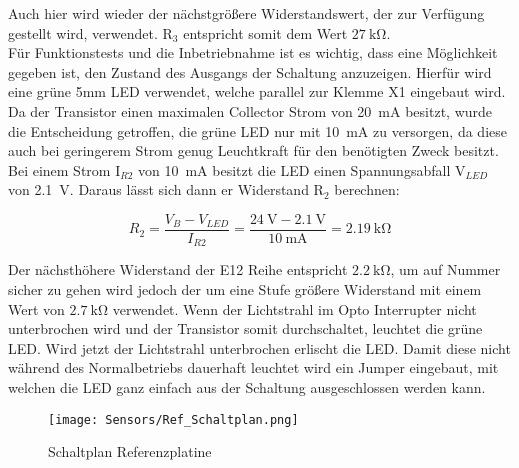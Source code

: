 Auch hier wird wieder der nächstgrößere Widerstandswert, der zur Verfügung gestellt wird, verwendet. R$_{3}$ entspricht somit dem Wert $\qty{27}{\kilo\ohm}$.\\
Für Funktionstests und die Inbetriebnahme ist es wichtig, dass eine Möglichkeit gegeben ist, den Zustand des Ausgangs der Schaltung anzuzeigen. Hierfür wird eine grüne 5mm LED verwendet, welche parallel zur Klemme X1 eingebaut wird. Da der Transistor einen maximalen Collector Strom von \qty{20}{\milli\ampere} besitzt, wurde die Entscheidung getroffen, die grüne LED nur mit \qty{10}{\milli\ampere} zu versorgen, da diese auch bei geringerem Strom genug Leuchtkraft für den benötigten Zweck besitzt. Bei einem Strom I$_{R2}$ von \qty{10}{\milli\ampere} besitzt die LED einen Spannungsabfall V$_{LED}$ von \qty{2.1}{\volt}.\cite{led_grün} Daraus lässt sich dann er Widerstand R$_{2}$ berechnen:

\begin{equation*}
    R_{2} = \frac{V_{B} - V_{LED}}{I_{R2}} = \frac{\qty{24}{\volt} - \qty{2.1}{\volt}}{\qty{10}{\milli\ampere}} = \qty{2.19}{\kilo\ohm}
\end{equation*}

Der nächsthöhere Widerstand der E12 Reihe entspricht $\qty{2,2}{\kilo\ohm}$, um auf Nummer sicher zu gehen wird jedoch der um eine Stufe größere Widerstand mit einem Wert von $\qty{2,7}{\kilo\ohm}$ verwendet. Wenn der Lichtstrahl im Opto Interrupter nicht unterbrochen wird und der Transistor somit durchschaltet, leuchtet die grüne LED. Wird jetzt der Lichtstrahl unterbrochen erlischt die LED. Damit diese nicht während des Normalbetriebs dauerhaft leuchtet wird ein Jumper eingebaut, mit welchen die LED ganz einfach aus der Schaltung ausgeschlossen werden kann.

\begin{figure}[H]
    \centering
    \texttt{[image: Sensors/Ref\_Schaltplan.png]}
    \caption{Schaltplan Referenzplatine}
    \label{Ref_Schaltplan}
\end{figure}

